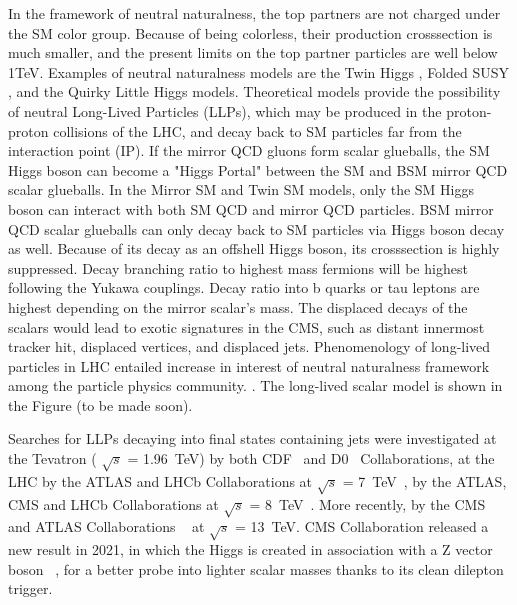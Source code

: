 In the framework of neutral naturalness, the top partners are not charged under the SM color group. 
Because of being colorless, their production crosssection is much smaller, and the present limits on the top partner particles are well below 1TeV. 
Examples of neutral naturalness models are the Twin Higgs \cite{Chacko:2005pe},
Folded SUSY \cite{Burdman:2006tz}, and the Quirky Little Higgs \cite{Cai:2008au} models.
Theoretical models provide the possibility of neutral Long-Lived Particles (LLPs), which may be produced in the proton-proton
collisions of the LHC, and decay back to SM particles far from the interaction point (IP).\cite{Craig:2015pha}
If the mirror QCD gluons form scalar glueballs, the SM Higgs boson can become a "Higgs Portal" between the SM and BSM mirror QCD scalar glueballs. 
In the Mirror SM and Twin SM models, only the SM Higgs boson can interact with both SM QCD and mirror QCD particles.
BSM mirror QCD scalar glueballs can only decay back to SM particles via Higgs boson decay as well. 
Because of its decay as an offshell Higgs boson, its crosssection is highly suppressed. 
Decay branching ratio to highest mass fermions will be highest following the Yukawa couplings.
Decay ratio into b quarks or tau leptons are highest depending on the mirror scalar's mass.
The displaced decays of the scalars would lead to exotic signatures in the CMS, such as distant innermost tracker hit, displaced vertices, and displaced jets.
Phenomenology of long-lived particles in LHC entailed increase in interest of neutral naturalness framework among the particle physics community. \cite{Curtin:2015fna,Csaki:2015fba}.
The long-lived scalar model is shown in the Figure (to be made soon).

Searches for LLPs decaying into final states containing jets were investigated
at the Tevatron ( $\sqrt{s}$ = 1.96~TeV) by both CDF~\cite{Aaltonen:2011rja} and D0~\cite{Abazov:2009ik} Collaborations,
at the LHC by the ATLAS and LHCb Collaborations at $\sqrt{s}$ = 7~TeV~\cite{ATLAS:2012av,Aaij:2014nma},
by the ATLAS, CMS and LHCb Collaborations at $\sqrt{s}$ = 8~TeV~\cite{Aad:2015uaa,Aad:2015rba,PhysRevD.91.012007,Aad:2015asa,Aaij:2017mic,Aaij:2016xmb,Aaij:2015ica}.
More recently, by the CMS ~\cite{Sirunyan:2017jdo,displacedvertices,displacedjets2016,delayedjets,emergingjets,CMS-PAS-EXO-19-021}
 and ATLAS Collaborations ~\cite{Aaboud:2018iil,Aaboud:2018jbr,Aaboud:2018arf,Aaboud:2018aqj,Aaboud:2018kbe,Aaboud:2019trc,Aaboud:2019opc,Aad:2019kiz,Aad:2019pfm,Aad:2019tcc,Aad:2019xav,Aad:2019tua} at $\sqrt{s}$ = 13~TeV. 
CMS Collaboration released a new result in 2021, in which the Higgs is created in association with a Z vector boson ~\cite{ZHAN}, for a better probe into lighter scalar masses thanks to its clean dilepton trigger.

